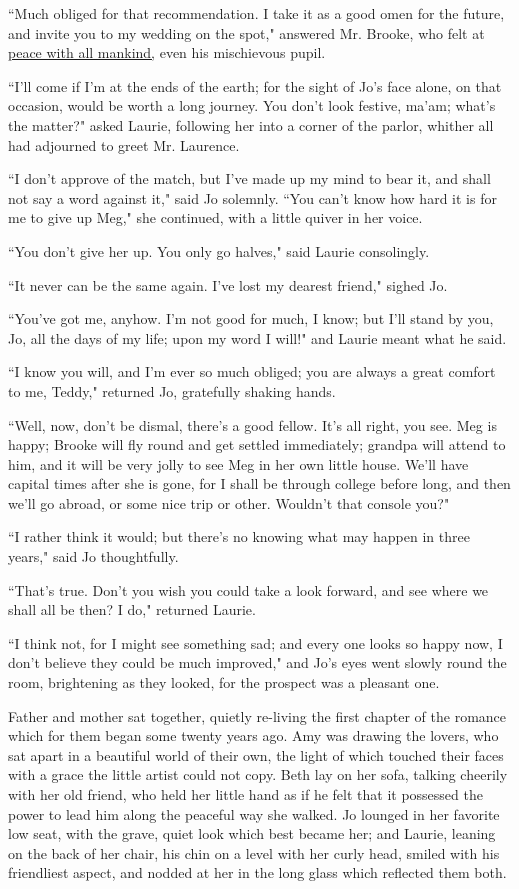 ``Much obliged for that recommendation. I take it as a good omen for the
future, and invite you to my wedding on the spot," answered Mr. Brooke,
who felt at \underline{peace with all mankind,} even his mischievous pupil.

``I'll come if I'm at the ends of the
earth; for the sight of Jo's face alone, on that
occasion, would be worth a long journey. You don't look
festive, ma'am; what's the matter?"
asked Laurie, following her into a corner of the parlor, whither all had
adjourned to greet Mr. Laurence.

``I don't approve of the match, but I've
made up my mind to bear it, and shall not say a word against it," said
Jo solemnly. ``You can't know how hard it is for me to
give up Meg," she continued, with a little quiver in her voice.

``You don't give her up. You only go halves," said Laurie
consolingly.

``It never can be the same again. I've lost my dearest
friend," sighed Jo.

``You've got me, anyhow. I'm not good for
much, I know; but I'll stand by you, Jo, all the days of
my life; upon my word I will!" and Laurie meant what he said.

``I know you will, and I'm ever so much obliged; you are
always a great comfort to me, Teddy," returned Jo, gratefully shaking
hands.

``Well, now, don't be dismal, there's a
good fellow. It's all right, you see. Meg is happy;
Brooke will fly round and get settled immediately; grandpa will attend
to him, and it will be very jolly to see Meg in her own little house.
We'll have capital times after she is gone, for I shall
be through college before long, and then we'll go
abroad, or some nice trip or other. Wouldn't that
console you?"

``I rather think it would; but there's no knowing what
may happen in three years," said Jo thoughtfully.

``That's true. Don't you wish you could
take a look forward, and see where we shall all be then? I do," returned
Laurie.

``I think not, for I might see something sad; and every one looks so
happy now, I don't believe they could be much improved,"
and Jo's eyes went slowly round the room, brightening as
they looked, for the prospect was a pleasant one.

Father and mother sat together, quietly re-living the first chapter of
the romance which for them began some twenty years ago. Amy was drawing
the lovers, who sat apart in a beautiful world of their own, the light
of which touched their faces with a grace the little artist could not
copy. Beth lay on her sofa, talking cheerily with her old friend, who
held her little hand as if he felt that it possessed the power to lead
him along the peaceful way she walked. Jo lounged in her favorite low
seat, with the grave, quiet look which best became her; and Laurie,
leaning on the back of her chair, his chin on a level with her curly
head, smiled with his friendliest aspect, and nodded at her in the long
glass which reflected them both.


